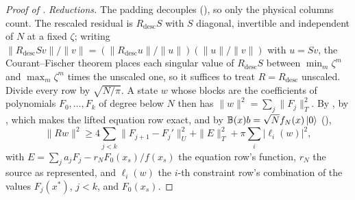\begin{proof}[Proof of ]
\emph{Reductions.} The padding decouples (), so only the physical columns count. The rescaled residual is $R_{\mathrm{desc}}S$ with $S$ diagonal, invertible and independent of $N$ at a fixed $\zeta$; writing $\|R_{\mathrm{desc}}Sv\|/\|v\|=(\|R_{\mathrm{desc}}u\|/\|u\|)(\|u\|/\|v\|)$ with $u=Sv$, the Courant--Fischer theorem places each singular value of $R_{\mathrm{desc}}S$ between $\min_m\zeta^m$ and $\max_m\zeta^m$ times the unscaled one, so it suffices to treat $R=R_{\mathrm{desc}}$ unscaled. Divide every row by $\sqrt{N/\pi}$. A state $w$ whose blocks are the coefficients of polynomials $F_0,\dots,F_k$ of degree below $N$ then has $\|w\|^2=\sum_j\|F_j\|_T^2$. By , by , which makes the lifted equation row exact, and by $\mathbb{B}(x)b=\sqrt N f_N(x)\ket0$ (),
\begin{equation}
    \|Rw\|^2\ge4\sum_{j<k}\|F_{j+1}-F_j'\|_U^2+\|E\|_T^2+\pi\sum_i|\ell_i(w)|^2 ,
    \label{eq:app-rows-below}
\end{equation}
with $E=\sum_ja_jF_j-r_NF_0(x_s)/f(x_s)$ the equation row's function, $r_N$ the source as represented, and $\ell_i(w)$ the $i$-th constraint row's combination of the values $F_j(x^*)$, $j<k$, and $F_0(x_s)$.


\end{proof}

